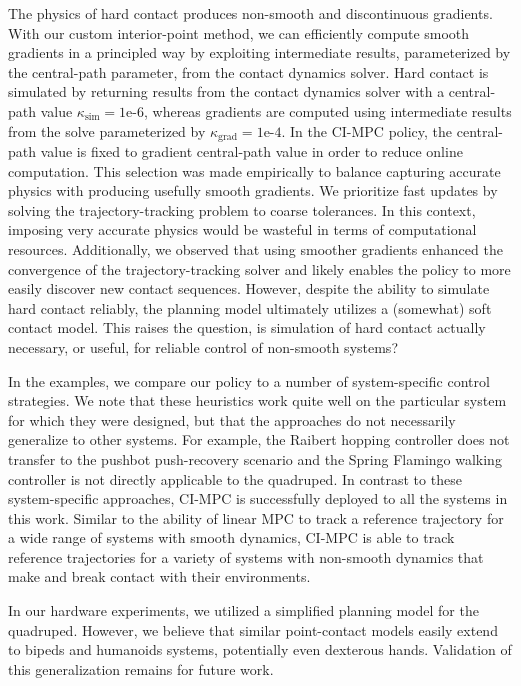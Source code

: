 The physics of hard contact produces non-smooth and discontinuous gradients. With our custom interior-point method, we can efficiently compute smooth gradients in a principled way by exploiting intermediate results, parameterized by the central-path parameter, from the contact dynamics solver. Hard contact is simulated by returning results from the contact dynamics solver with a central-path value $\kappa_{\mbox{sim}} = 1\mbox{e-}6$, whereas gradients are computed using intermediate results from the solve parameterized by $\kappa_{\mbox{grad}} = 1\mbox{e-}4$. In the CI-MPC policy, the central-path value is fixed to gradient central-path value in order to reduce online computation. This selection was made empirically to balance capturing accurate physics with producing usefully smooth gradients. We prioritize fast updates by solving the trajectory-tracking problem to coarse tolerances. In this context, imposing very accurate physics would be wasteful in terms of computational resources.  Additionally, we observed that using smoother gradients enhanced the convergence of the trajectory-tracking solver and likely enables the policy to more easily discover new contact sequences. However, despite the ability to simulate hard contact reliably, the planning model ultimately utilizes a (somewhat) soft contact model. This raises the question, is simulation of hard contact actually necessary, or useful, for reliable control of non-smooth systems?

In the examples, we compare our policy to a number of system-specific control strategies. We note that these heuristics work quite well on the particular system for which they were designed, but that the approaches do not necessarily generalize to other systems. For example, the Raibert hopping controller does not transfer to the pushbot push-recovery scenario and the Spring Flamingo walking controller is not directly applicable to the quadruped. In contrast to these system-specific approaches, CI-MPC is successfully deployed to all the systems in this work. Similar to the ability of linear MPC to track a reference trajectory for a wide range of systems with smooth dynamics, CI-MPC is able to track reference trajectories for a variety of systems with non-smooth dynamics that make and break contact with their environments. 

In our hardware experiments, we utilized a simplified planning model for the quadruped. However, we believe that similar point-contact models easily extend to bipeds and humanoids systems, potentially even dexterous hands. Validation of this generalization remains for future work.

